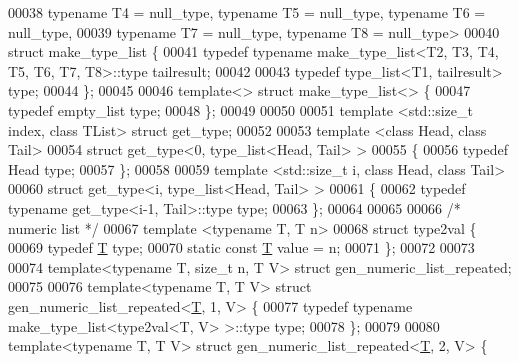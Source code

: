 \begin{DoxyCode}
00038          \textcolor{keyword}{typename} T4 = null\_type, \textcolor{keyword}{typename} T5 = null\_type, \textcolor{keyword}{typename} T6 = null\_type,
00039          \textcolor{keyword}{typename} T7 = null\_type, \textcolor{keyword}{typename} T8 = null\_type>
00040 \textcolor{keyword}{struct }make\_type\_list \{
00041   \textcolor{keyword}{typedef} \textcolor{keyword}{typename} make\_type\_list<T2, T3, T4, T5, T6, T7, T8>::type tailresult;
00042 
00043   \textcolor{keyword}{typedef} type\_list<T1, tailresult> type;
00044 \};
00045 
00046 \textcolor{keyword}{template}<> \textcolor{keyword}{struct }make\_type\_list<> \{
00047   \textcolor{keyword}{typedef} empty\_list type;
00048 \};
00049 
00050 
00051 \textcolor{keyword}{template} <std::\textcolor{keywordtype}{size\_t} index, \textcolor{keyword}{class} TList> \textcolor{keyword}{struct }get\_type;
00052 
00053 \textcolor{keyword}{template} <\textcolor{keyword}{class} Head, \textcolor{keyword}{class} Tail>
00054 \textcolor{keyword}{struct }get\_type<0, type\_list<Head, Tail> >
00055 \{
00056   \textcolor{keyword}{typedef} Head type;
00057 \};
00058 
00059 \textcolor{keyword}{template} <std::\textcolor{keywordtype}{size\_t} i, \textcolor{keyword}{class} Head, \textcolor{keyword}{class} Tail>
00060 \textcolor{keyword}{struct }get\_type<i, type\_list<Head, Tail> >
00061 \{
00062   \textcolor{keyword}{typedef} \textcolor{keyword}{typename} get\_type<i-1, Tail>::type type;
00063 \};
00064 
00065 
00066 \textcolor{comment}{/* numeric list */}
00067 \textcolor{keyword}{template} <\textcolor{keyword}{typename} T, T n>
00068 \textcolor{keyword}{struct }type2val \{
00069   \textcolor{keyword}{typedef} \hyperlink{group___sparse_core___module_class_eigen_1_1_triplet}{T} type;
00070   \textcolor{keyword}{static} \textcolor{keyword}{const} \hyperlink{group___sparse_core___module_class_eigen_1_1_triplet}{T} value = n;
00071 \};
00072 
00073 
00074 \textcolor{keyword}{template}<\textcolor{keyword}{typename} T, \textcolor{keywordtype}{size\_t} n, T V> \textcolor{keyword}{struct }gen\_numeric\_list\_repeated;
00075 
00076 \textcolor{keyword}{template}<\textcolor{keyword}{typename} T, T V> \textcolor{keyword}{struct }gen\_numeric\_list\_repeated<\hyperlink{group___sparse_core___module_class_eigen_1_1_triplet}{T}, 1, V> \{
00077   \textcolor{keyword}{typedef} \textcolor{keyword}{typename} make\_type\_list<type2val<T, V> >::type type;
00078 \};
00079 
00080 \textcolor{keyword}{template}<\textcolor{keyword}{typename} T, T V> \textcolor{keyword}{struct }gen\_numeric\_list\_repeated<\hyperlink{group___sparse_core___module_class_eigen_1_1_triplet}{T}, 2, V> \{

\end{DoxyCode}
